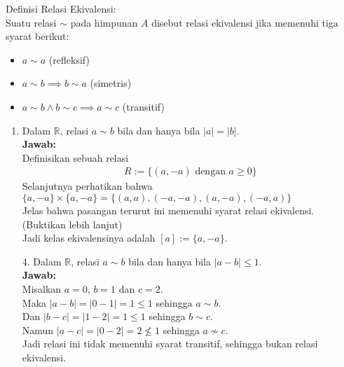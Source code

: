 \documentclass{article}
\begin{document}
Definisi Relasi Ekivalensi:\\

Suatu relasi $\sim$ pada himpunan $A$ disebut relasi ekivalensi jika memenuhi tiga syarat berikut:
\begin{itemize}
  \item $a\sim a$ (refleksif)
  \item $a\sim b \implies b\sim a$ (simetris)
  \item $a\sim b \land b\sim c \implies a\sim c$ (transitif)
\end{itemize}
\begin{enumerate}
  \item Dalam $\mathbb{R}$, relasi $a \sim b$ bila dan hanya bila $|a| = |b|$.\\
        \textbf{Jawab:}\\
        Definisikan sebuah relasi
        \begin{align*}
          R:=\{(a,-a) \text{ dengan } a\geq 0\}
        \end{align*}
        Selanjutnya perhatikan bahwa $\{a,-a\}\times\{a,-a\} = \{(a,a),(-a,-a),(a,-a),(-a,a)\}$\\
        Jelas bahwa pasangan terurut ini memenuhi syarat relasi ekivalensi.\\
        (Buktikan lebih lanjut)\\
        Jadi kelas ekivalensinya adalah $[a]:=\{a,-a\}$.
  \item[4.] Dalam $\mathbb{R}$, relasi $a \sim b$ bila dan hanya bila $|a-b| \leq 1$.\\
        \textbf{Jawab:}\\
        Misalkan $a=0$, $b=1$ dan $c=2$.\\
        Maka $|a-b| = |0-1| = 1 \leq 1$ sehingga $a\sim b$.\\
        Dan $|b-c| = |1-2| = 1 \leq 1$ sehingga $b\sim c$.\\
        Namun $|a-c| = |0-2| = 2 \not\leq 1$ sehingga $a \not\sim c$.\\
        Jadi relasi ini tidak memenuhi syarat transitif, sehingga bukan relasi ekivalensi.
\end{enumerate}
\end{document}
